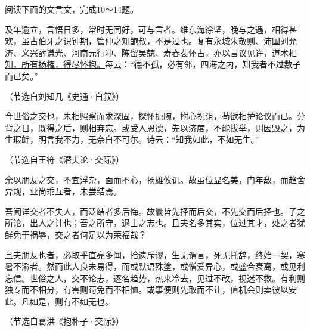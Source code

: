 \documentclass[11pt,a4paper]{ctexart}
\begin{document}
\par\vspace{2.2em}

阅读下面的文言文，完成10～14题。

\begin{materialtext}
及年逾立，言悟日多，常时无同好，可与言者。维东海徐坚，晚与之遇，相得甚欢，虽古伯牙之识钟期，管仲之知鲍叔，不是过也。复有永城朱敬则、沛国刘允济、义兴薛谦光、河南元行冲、陈留吴兢、寿春裴怀古，\uline{亦以言议见许，道术相知，所有扬榷，得尽怀抱。}每云：“德不孤，必有邻，四海之内，知我者不过数子而已矣。”
\end{materialtext}
\begin{flushright}（节选自刘知几《史通·自叙》）\end{flushright}

\begin{materialtext}
今世俗之交也，未相照察而求深固，探怀扼腕，拊心祝诅，苟欲相护论议而已。分背之日，既得之后，则相弃忘。或受人恩德，先以济度，不能拔举，则因毁之，为生瑕衅，明言我不力，无奈自不可尔。诗云：“知我如此，不如无生。”
\end{materialtext}
\begin{flushright}（节选自王符《潜夫论·交际》）\end{flushright}

\begin{materialtext}
\uline{余以朋友之交，不宜浮杂，面而不心，扬雄攸讥。}故虽位显名美，门年敌，而趋舍异规，业尚乖互者，未尝结焉。

吾闻详交者不失人，而泛结者多后悔。故曩哲先择而后交，不先交而后择也。子之所论，出人之计也；吾之所守，退士之志也。且夫名多其实，位过其才，处之者犹鲜免于祸辱，交之者何足以为荣福哉？

且夫朋友也者，必取乎直亮多闻，拾遗斥谬，生无谓言，死无托辞，终始一契，寒暑不渝者。然而此人良未易得，而或默语殊塗，或憎爱异心，或盛合衰离，或见利忘信。世俗之人，交不论志，逐名趋势，热来冷去，见过不改，视迷不救。有利则独专而不相分，有害则苟免而不相恤。或事便则先取而不让，值机会则卖彼以安此。凡如是，则有不如无也。
\end{materialtext}
\begin{flushright}（节选自葛洪《抱朴子·交际》）\end{flushright}

\end{document}
